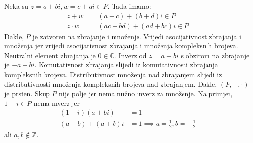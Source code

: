 \documentclass{exam}
\begin{document}
\begin{questions}
\begin{solution}
Neka su $z = a + bi, w = c + di \in P$. Tada imamo:
\begin{align*}
  z + w &= (a + c) + (b + d)i \in P\\
  z \cdot w &= (ac - bd) + (ad + bc)i \in P
\end{align*}
Dakle, $P$ je zatvoren na zbrajanje i množenje. Vrijedi asocijativnost zbrajanja i množenja jer vrijedi asocijativnost zbrajanja i množenja kompleksnih brojeva. Neutralni element zbrajanja je $0 \in \mathbb{C}$. Inverz od $z = a + bi$ s obzirom na zbrajanje je $-a - bi$. Komutativnost zbrajanja slijedi iz komutativnosti zbrajanja kompleksnih brojeva. Distributivnost množenja nad zbrajanjem slijedi iz distributivnosti množenja kompleksnih brojeva nad zbrajanjem. Dakle, $(P, +, \cdot)$ je prsten. Skup $P$ nije polje jer nema nužno inverz za množenje. Na primjer, $1 + i \in P$ nema inverz jer
\begin{align*}
  (1 + i)(a + bi) &= 1\\
  (a - b) + (a + b)i &= 1 \implies a = \frac{1}{2}, b = -\frac{1}{2}
\end{align*}
ali $a, b \notin \mathbb{Z}$.
\end{solution}

\question
{}

\begin{solution}
\begin{parts}

\end{parts}
\end{solution}
\end{questions}
\end{document}

